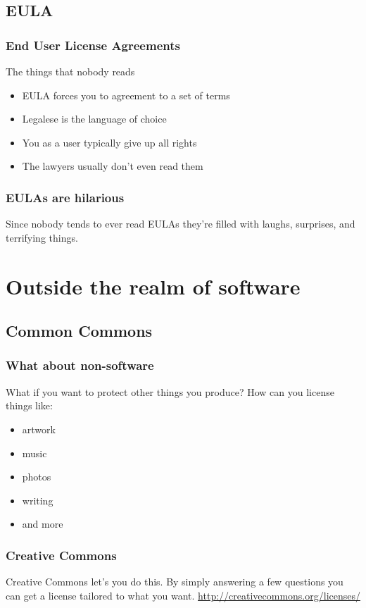 \documentclass{beamer}
\begin{document}
	\subsection{EULA}
	\begin{frame}
		\frametitle{End User License Agreements}
		The things that nobody reads\\
		\begin{itemize}[<+->]
			\item EULA forces you to agreement to a set of terms
			\item Legalese is the language of choice
			\item You as a user typically give up all rights
			\item The lawyers usually don't even read them
		\end{itemize}
	\end{frame}
	\begin{frame}
		\frametitle{EULAs are hilarious}
		Since nobody tends to ever read EULAs they're filled with laughs, surprises, and terrifying things.\\
	\end{frame}
	\section{Outside the realm of software}
	\subsection{Common Commons}
	\begin{frame}
		\frametitle{What about non-software}
		What if you want to protect other things you produce? How can you license things like:
		\pause
		\begin{itemize}[<+->]
			\item artwork
			\item music
			\item photos
			\item writing
			\item and more
		\end{itemize}
	\end{frame}
	\begin{frame}
		\frametitle{Creative Commons}
		Creative Commons let's you do this. By simply answering a few questions you can get a
		license tailored to what you want. \url{http://creativecommons.org/licenses/}
	\end{frame}
\end{document}
